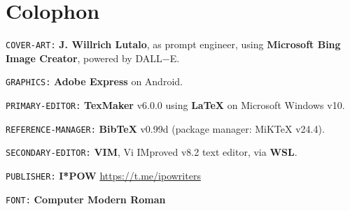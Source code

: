 \documentclass[a4paper, 18pt]{book} %
\begin{document}
\chapter*{Colophon}


\texttt{COVER-ART:} \textbf{J. Willrich Lutalo}, as prompt engineer, using \textbf{Microsoft Bing Image Creator}, powered by DALL$-$E.


\texttt{GRAPHICS:} \textbf{Adobe Express} on Android.


\texttt{PRIMARY-EDITOR:} \textbf{TexMaker} v6.0.0 using \textbf{LaTeX} on Microsoft Windows v10.


\texttt{REFERENCE-MANAGER:} \textbf{BibTeX} v0.99d (package manager: MiKTeX v24.4).


\texttt{SECONDARY-EDITOR:} \textbf{VIM}, Vi IMproved v8.2 text editor, via \textbf{WSL}.


\texttt{PUBLISHER:} \textbf{I*POW} \url{https://t.me/ipowriters}


\texttt{FONT:} \textbf{Computer Modern Roman}


\end{document}
